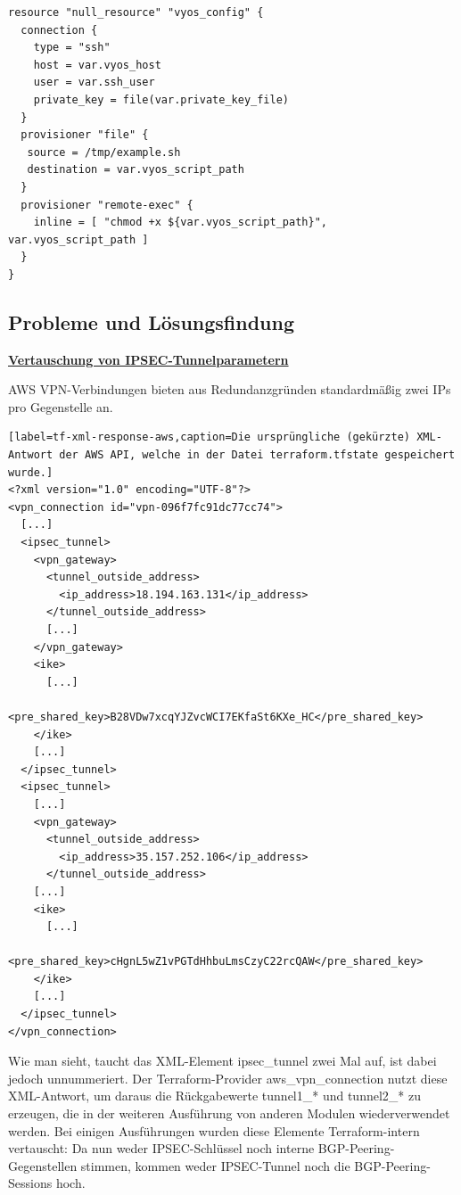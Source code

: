 \begin{lstlisting}[label=tf-generate-psk,caption=Das so generierte Shell-Skript wird per SSH auf das Zielsystem (VyOS-Router) hochgeladen und per provisioner remote-exec ausgeführt.]
resource "null_resource" "vyos_config" {
  connection {
    type = "ssh"
    host = var.vyos_host
    user = var.ssh_user
    private_key = file(var.private_key_file)
  }
  provisioner "file" {
   source = /tmp/example.sh
   destination = var.vyos_script_path
  }
  provisioner "remote-exec" {
    inline = [ "chmod +x ${var.vyos_script_path}", var.vyos_script_path ]
  }
}
\end{lstlisting}

\newpage
\subsection{Probleme und Lösungsfindung}

\textbf{\underline{Vertauschung von IPSEC-Tunnelparametern}}

AWS VPN-Verbindungen bieten aus Redundanzgründen standardmäßig zwei IPs pro Gegenstelle an. 

\begin{lstlisting}[label=tf-xml-response-aws,caption=Die ursprüngliche (gekürzte) XML-Antwort der AWS API, welche in der Datei terraform.tfstate gespeichert wurde.]
<?xml version="1.0" encoding="UTF-8"?>
<vpn_connection id="vpn-096f7fc91dc77cc74">
  [...]
  <ipsec_tunnel>
    <vpn_gateway>
      <tunnel_outside_address>
        <ip_address>18.194.163.131</ip_address>
      </tunnel_outside_address>
      [...]
    </vpn_gateway>
    <ike>
      [...]
      <pre_shared_key>B28VDw7xcqYJZvcWCI7EKfaSt6KXe_HC</pre_shared_key>
    </ike>
    [...]
  </ipsec_tunnel>
  <ipsec_tunnel>
    [...]
    <vpn_gateway>
      <tunnel_outside_address>
        <ip_address>35.157.252.106</ip_address>
      </tunnel_outside_address>
    [...]
    <ike>
      [...]
      <pre_shared_key>cHgnL5wZ1vPGTdHhbuLmsCzyC22rcQAW</pre_shared_key>
    </ike>
    [...]
  </ipsec_tunnel>
</vpn_connection>

\end{lstlisting}

Wie man sieht, taucht das XML-Element ipsec\_tunnel zwei Mal auf, ist dabei jedoch unnummeriert.
Der Terraform-Provider aws\_vpn\_connection nutzt diese XML-Antwort, um daraus die Rückgabewerte tunnel1\_* und tunnel2\_* zu erzeugen, die in der weiteren Ausführung von anderen Modulen wiederverwendet werden. Bei einigen Ausführungen wurden diese Elemente Terraform-intern vertauscht: Da nun weder IPSEC-Schlüssel noch interne BGP-Peering-Gegenstellen stimmen, kommen weder IPSEC-Tunnel noch die BGP-Peering-Sessions hoch.

